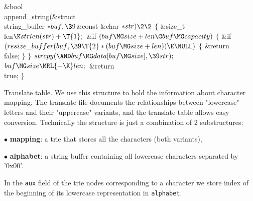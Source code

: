\Y\B\1\1\&{bool} \\{append\_string}(\&{struct} \\{string\_buffer} ${}{*}%
\\{buf},\39{}$\&{const} \&{char} ${}{*}\\{str})\2\2{}$\6
${}\{{}$\1\6
\&{size\_t} \\{len}${}\K\\{strlen}(\\{str})+\T{1};{}$\7
\&{if} ${}(\\{buf}\MG\\{size}+\\{len}\G\\{buf}\MG\\{capacity}){}$\5
${}\{{}$\1\6
\&{if} ${}(\\{resize\_buffer}(\\{buf},\39\T{2}*(\\{buf}\MG\\{size}+\\{len}))\E%
\NULL){}$\5
${}\{{}$\1\6
\&{return} \\{false};\6
\4${}\}{}$\2\6
\4${}\}{}$\2\6
${}\\{strcpy}({\AND}\\{buf}\MG\\{data}[\\{buf}\MG\\{size}],\39\\{str});{}$\6
${}\\{buf}\MG\\{size}\MRL{+{\K}}\\{len};{}$\6
\&{return} \\{true};\6
\4${}\}{}$\2\par
\fi

Translate table.
We use this structure to hold the information about character mapping. The
translate file documents the relationships
between "lowercase" letters and their "uppercase" variants, and the translate
table allows easy conversion. Technically
the structure is just a combination of 2 substructures:

\item{$\bullet$} {\bf mapping}: a trie that stores all the characters (both
variants),
\item{$\bullet$} {\bf alphabet}: a string buffer containing all lowercase
characters separated by '0x00'.

In the {\tt aux} field of the trie nodes corresponding to a character we store
index of the beginning of its lowercase
representation in {\tt alphabet}.


